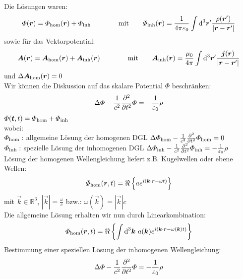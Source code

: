 Die Lösungen waren:
\begin{equation*}
\varPhi(\bm{r}) = \varPhi_{\textrm{hom}}(\bm{r}) + \varPhi_{\textrm{inh}}
\qquad \qquad
\textrm{mit}
\qquad 
\varPhi_{\textrm{inh}}(\bm{r}) = \frac{1}{4\pi\varepsilon_0} \int \textrm{d}^3 \bm{r}' \frac{\rho(\bm{r}')}{| \bm{r} - \bm{r}' |}
\end{equation*}
sowie für das Vektorpotential:
\begin{equation*}
\bm{A}(\bm{r}) = \bm{A}_{\textrm{hom}} (\bm{r}) + \bm{A}_{\textrm{inh}} (\bm{r})
\qquad \qquad 
\textrm{mit}
\qquad
\bm{A}_{\textrm{inh}} (\bm{r}) = \frac{\mu_0}{4 \pi} \int \textrm{d} ^3 \bm{r}' \frac{\bm{j}(\bm{r})}{| \bm{r} - \bm{r}' |}
\end{equation*}
und $ \Delta \bm{A}_{\textrm{hom}}(\bm{r}) = 0 $\\[10pt]
Wir können die Diskussion auf das skalare Potential $ \Phi $ beschränken:
\begin{equation*}
\Delta \varPhi - \frac{1}{c^2} \frac{\partial ^2}{\partial t^2} \varPhi = - \frac{1}{\varepsilon_0} \rho
\end{equation*}
$ \varPhi(\bm{t},t) = \varPhi_{\textrm{hom}} + \varPhi_{\textrm{inh}} $\\
wobei:\\
$ \varPhi_{\textrm{hom}} : $ allgemeine Lösung der homogenen DGL $ \Delta \varPhi_{\textrm{hom}} - \frac{1}{c^2} \frac{\partial ^2}{\partial t^2} \varPhi_{\textrm{hom}} = 0 $ \\
$ \varPhi_{\textrm{inh}} : $ spezielle Lösung der inhomogenen DGL $ \Delta \varPhi_{\textrm{inh}} - \frac{1}{c^2} \frac{\partial ^2}{\partial t^2} \varPhi_{\textrm{inh}} = - \frac{1}{\varepsilon_0} \rho $\\[5pt]
Lösung der homogenen Wellengleichung liefert z.B. Kugelwellen oder ebene Wellen:
\begin{equation*}
\varPhi_{\textrm{hom}}(\bm{r},t) = \Re \left\{ a e^{i(\bm{k} \cdot \bm{r} - \omega t)} \right\}
\end{equation*}
mit $ \vec{k} \in \mathbb{R}^3 $, $ |\vec{k}| = \frac{\omega}{c} $ bzw.: $ \omega(\vec{k}) = |\vec{k}| c $\\[5pt]
Die allgemeine Lösung erhalten wir nun durch Linearkombination:
\begin{equation*}
\varPhi_{\textrm{hom}}(\bm{r},t) = \Re \left\{ \int \textrm{d} ^3 \bm{k} \ a (\bm{k}) e^{i (\bm{k} \cdot \bm{r} - \omega(\bm{k}) t)} \right\}
\end{equation*}
Bestimmung einer speziellen Lösung der inhomogenen Wellengleichung:
\begin{equation*}
\Delta \varPhi - \frac{1}{c^2} \frac{\partial ^2}{\partial t^2} \varPhi = - \frac{1}{\varepsilon_0} \rho
\end{equation*}
